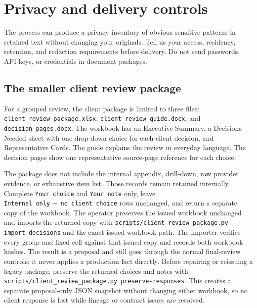 \documentclass[
]{article}
\begin{document}
\section{Privacy and delivery
controls}\label{privacy-and-delivery-controls}

The process can produce a privacy inventory of obvious sensitive
patterns in retained text without changing your originals. Tell us your
access, residency, retention, and redaction requirements before
delivery. Do not send passwords, API keys, or credentials in document
packages.

\subsection{The smaller client review
package}\label{the-smaller-client-review-package}

For a grouped review, the client package is limited to three files:
\texttt{client\_\allowbreak{}review\_\allowbreak{}package.xlsx},
\texttt{client\_\allowbreak{}review\_\allowbreak{}guide.docx}, and
\texttt{decision\_\allowbreak{}pages.docx}. The workbook has an
Executive Summary, a Decisions Needed sheet with one drop-down choice
for each client decision, and Representative Cards. The guide explains
the review in everyday language. The decision pages show one
representative source-page reference for each choice.

The package does not include the internal appendix, drill-down, raw
provider evidence, or exhaustive item list. Those records remain
retained internally. Complete \texttt{Your\ choice} and
\texttt{Your\ note} only, leave
\texttt{Internal\ only\ —\ no\ client\ choice} rows unchanged, and
return a separate copy of the workbook. The operator preserves the
issued workbook unchanged and imports the returned copy with
\texttt{scripts/\allowbreak{}client\_\allowbreak{}review\_\allowbreak{}package.py import-\allowbreak{}decisions}
and the exact issued workbook path. The importer verifies every group
and fixed cell against that issued copy and records both workbook
hashes. The result is a proposal and still goes through the normal
final-review controls; it never applies a production fact directly.
Before repairing or reissuing a legacy package, preserve the returned
choices and notes with
\texttt{scripts/\allowbreak{}client\_\allowbreak{}review\_\allowbreak{}package.py preserve-\allowbreak{}responses}.
This creates a separate proposal-only JSON snapshot without changing
either workbook, so no client response is lost while lineage or contract
issues are resolved.
\end{document}
